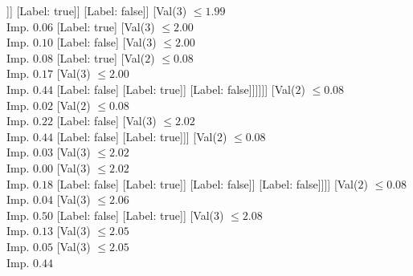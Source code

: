 \documentclass[margin=10pt]{standalone}
\begin{document}
\begin{forest}
								[Val($3$) $ \leq 2.05$ \\ Imp. $0.10$
									[Val($3$) $ \leq 2.00$ \\ Imp. $0.01$
										[Val($3$) $ \leq 1.99$ \\ Imp. $0.09$
											[Val($3$) $ \leq 1.98$ \\ Imp. $0.02$
												[Val($3$) $ \leq 1.98$ \\ Imp. $0.14$
													[Val($3$) $ \leq 1.98$ \\ Imp. $0.05$
														[Label: false]
														[Val($3$) $ \leq 1.98$ \\ Imp. $0.44$
															[Label: true]
															[Label: false]]]
													[Label: true]]
												[Label: false]]
											[Val($3$) $ \leq 1.99$ \\ Imp. $0.06$
												[Label: true]
												[Val($3$) $ \leq 2.00$ \\ Imp. $0.10$
													[Label: false]
													[Val($3$) $ \leq 2.00$ \\ Imp. $0.08$
														[Label: true]
														[Val($2$) $ \leq 0.08$ \\ Imp. $0.17$
															[Val($3$) $ \leq 2.00$ \\ Imp. $0.44$
																[Label: false]
																[Label: true]]
															[Label: false]]]]]]
										[Val($2$) $ \leq 0.08$ \\ Imp. $0.02$
											[Val($2$) $ \leq 0.08$ \\ Imp. $0.22$
												[Label: false]
												[Val($3$) $ \leq 2.02$ \\ Imp. $0.44$
													[Label: false]
													[Label: true]]]
											[Val($2$) $ \leq 0.08$ \\ Imp. $0.03$
												[Val($3$) $ \leq 2.02$ \\ Imp. $0.00$
													[Val($3$) $ \leq 2.02$ \\ Imp. $0.18$
														[Label: false]
														[Label: true]]
													[Label: false]]
												[Label: false]]]]
									[Val($2$) $ \leq 0.08$ \\ Imp. $0.04$
										[Val($3$) $ \leq 2.06$ \\ Imp. $0.50$
											[Label: false]
											[Label: true]]
										[Val($3$) $ \leq 2.08$ \\ Imp. $0.13$
											[Val($3$) $ \leq 2.05$ \\ Imp. $0.05$
												[Val($3$) $ \leq 2.05$ \\ Imp. $0.44$

\end{forest}
\end{document}
